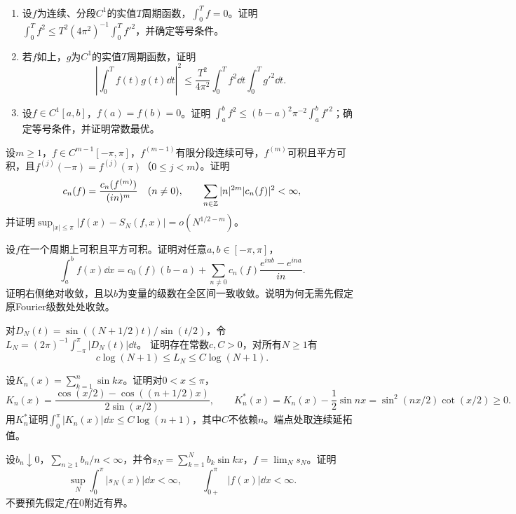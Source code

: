 \begin{enumerate}[label=(\arabic*)]
\item 设$f$为连续、分段$C^1$的实值$T$周期函数，$\int_0^Tf=0$。证明
$\int_0^Tf^2\le T^2(4\pi^2)^{-1}\int_0^Tf'^2$，并确定等号条件。
\item 若$f$如上，$g$为$C^1$的实值$T$周期函数，证明
\[
 \left|\int_0^Tf(t)g(t)\dd t\right|^2
 \le\frac{T^2}{4\pi^2}\int_0^Tf^2\dd t\int_0^Tg'^2\dd t.
\]
\item 设$f\in C^1[a,b]$，$f(a)=f(b)=0$。证明
$\int_a^bf^2\le(b-a)^2\pi^{-2}\int_a^bf'^2$；确定等号条件，并证明常数最优。
\end{enumerate}

设$m\ge1$，$f\in C^{m-1}[-\pi,\pi]$，$f^{(m-1)}$有限分段连续可导，$f^{(m)}$可积且平方可积，且$f^{(j)}(-\pi)=f^{(j)}(\pi)$（$0\le j<m$）。证明
\[
 c_n(f)=\frac{c_n(f^{(m)})}{(in)^m}\quad(n\ne0),\qquad
 \sum_{n\in\mathbb Z}|n|^{2m}|c_n(f)|^2<\infty,
\]
并证明$\sup_{|x|\le\pi}|f(x)-S_N(f,x)|=o(N^{1/2-m})$。

设$f$在一个周期上可积且平方可积。证明对任意$a,b\in[-\pi,\pi]$，
\[
 \int_a^bf(x)\dd x=c_0(f)(b-a)+\sum_{n\ne0}c_n(f)\frac{e^{inb}-e^{ina}}{in}.
\]
证明右侧绝对收敛，且以$b$为变量的级数在全区间一致收敛。说明为何无需先假定原Fourier级数处处收敛。

对$D_N(t)=\sin((N+1/2)t)/\sin(t/2)$，令
$L_N=(2\pi)^{-1}\int_{-\pi}^{\pi}|D_N(t)|\dd t$。
证明存在常数$c,C>0$，对所有$N\ge1$有
\[
 c\log(N+1)\le L_N\le C\log(N+1).
\]

设$K_n(x)=\sum_{k=1}^n\sin kx$。证明对$0<x\le\pi$，
\[
 K_n(x)=\frac{\cos(x/2)-\cos((n+1/2)x)}{2\sin(x/2)},\qquad
 K_n^*(x)=K_n(x)-\frac12\sin nx=\sin^2(nx/2)\cot(x/2)\ge0.
\]
用$K_n^*$证明$\int_0^\pi|K_n(x)|\dd x\le C\log(n+1)$，其中$C$不依赖$n$。端点处取连续延拓值。

设$b_n\downarrow0$，$\sum_{n\ge1}b_n/n<\infty$，并令$s_N=\sum_{k=1}^Nb_k\sin kx$，$f=\lim_Ns_N$。证明
\[
 \sup_N\int_0^\pi|s_N(x)|\dd x<\infty,\qquad
 \int_{0+}^\pi|f(x)|\dd x<\infty.
\]
不要预先假定$f$在$0$附近有界。

